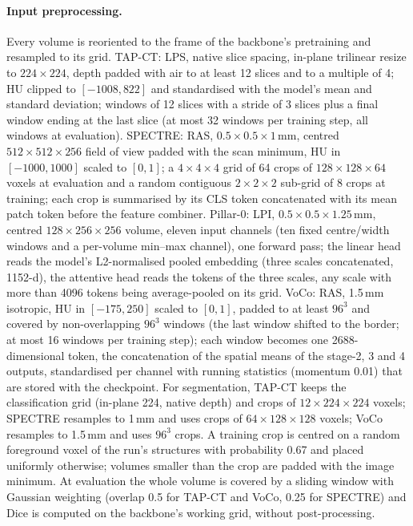 \paragraph{Input preprocessing.} Every volume is reoriented to the frame of the backbone's pretraining and resampled to its grid. TAP-CT: LPS, native slice spacing, in-plane trilinear resize to $224\times224$, depth padded with air to at least 12 slices and to a multiple of 4; HU clipped to $[-1008, 822]$ and standardised with the model's mean and standard deviation; windows of 12 slices with a stride of 3 slices plus a final window ending at the last slice (at most 32 windows per training step, all windows at evaluation). SPECTRE: RAS, $0.5\times0.5\times1$\,mm, centred $512\times512\times256$ field of view padded with the scan minimum, HU in $[-1000, 1000]$ scaled to $[0,1]$; a $4\times4\times4$ grid of 64 crops of $128\times128\times64$ voxels at evaluation and a random contiguous $2\times2\times2$ sub-grid of 8 crops at training; each crop is summarised by its CLS token concatenated with its mean patch token before the feature combiner. Pillar-0: LPI, $0.5\times0.5\times1.25$\,mm, centred $128\times256\times256$ volume, eleven input channels (ten fixed centre/width windows and a per-volume min--max channel), one forward pass; the linear head reads the model's L2-normalised pooled embedding (three scales concatenated, 1152-d), the attentive head reads the tokens of the three scales, any scale with more than 4096 tokens being average-pooled on its grid. VoCo: RAS, 1.5\,mm isotropic, HU in $[-175, 250]$ scaled to $[0,1]$, padded to at least $96^3$ and covered by non-overlapping $96^3$ windows (the last window shifted to the border; at most 16 windows per training step); each window becomes one 2688-dimensional token, the concatenation of the spatial means of the stage-2, 3 and 4 outputs, standardised per channel with running statistics (momentum 0.01) that are stored with the checkpoint. For segmentation, TAP-CT keeps the classification grid (in-plane 224, native depth) and crops of $12\times224\times224$ voxels; SPECTRE resamples to 1\,mm and uses crops of $64\times128\times128$ voxels; VoCo resamples to 1.5\,mm and uses $96^3$ crops. A training crop is centred on a random foreground voxel of the run's structures with probability 0.67 and placed uniformly otherwise; volumes smaller than the crop are padded with the image minimum. At evaluation the whole volume is covered by a sliding window with Gaussian weighting (overlap 0.5 for TAP-CT and VoCo, 0.25 for SPECTRE) and Dice is computed on the backbone's working grid, without post-processing.

